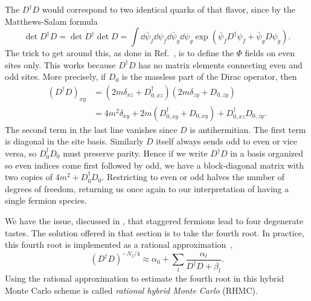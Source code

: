 The $D^\dagger D$ would correspond to two identical quarks of that flavor, since
by the Matthews-Salam formula
\begin{equation}
\det D^\dagger D = \det D^\dagger \det D
=\int \dd{\bar{\psi}_f}\dd{\psi_f}\dd{\bar{\psi}_g}\dd{\psi_g}
\exp\left(\bar{\psi}_fD^\dagger\psi_f+\bar{\psi}_gD \psi_g\right).
\end{equation}
The trick to get around this, as done in 
Ref.~\cite{gottlieb_hybrid-molecular-dynamics_1987}, is to define the
$\Phi$ fields on even sites only. This works because $D^\dagger D$ has no
matrix elements connecting even and odd sites. More precisely, if
$D_0$ is the massless part of the Dirac operator, then
\begin{equation}\begin{aligned}
\left(D^\dagger D\right)_{xy}
&=\left(2m\delta_{xz}+D^\dagger_{0,xz}\right)
  \left(2m\delta_{zy}+D_{0,zy}\right)\\
&=4m^2\delta_{xy}+2m\left(D^\dagger_{0,xy}+D_{0,xy}\right)+D^\dagger_{0,xz}D_{0,zy}.
\end{aligned}\end{equation}
The second term in the last line vanishes since $D$ is antihermitian.
The first term is diagonal in the site basis. Similarly $D$ itself always sends
odd to even or vice versa, so $D_0^\dagger D_0$ must preserve parity.
Hence if we write $D^\dagger D$ in a basis organized so even indices come first 
followed by odd, we have a block-diagonal matrix with two copies of
$4m^2+D_0^\dagger D_0$. Restricting to even or odd halves the number of degrees
of freedom, returning us once again to our interpretation of having a single
fermion species.

We have the issue, discussed in
, that staggered fermions lead to four degenerate tastes.
The solution offered in that section is to take the fourth root. In practice,
this fourth root is implemented as a rational 
approximation~\cite{clark_rhmc_2004,clark_rational_2006},
\begin{equation}
\left(D^\dagger D\right)^{-N_f/4}\approx\alpha_0+\sum_l\frac{\alpha_l}{D^\dagger
D+\beta_l}.
\end{equation}
Using the rational approximation to estimate the fourth root in this hybrid
Monte Carlo scheme is called {\it rational hybrid Monte Carlo}
(RHMC).


